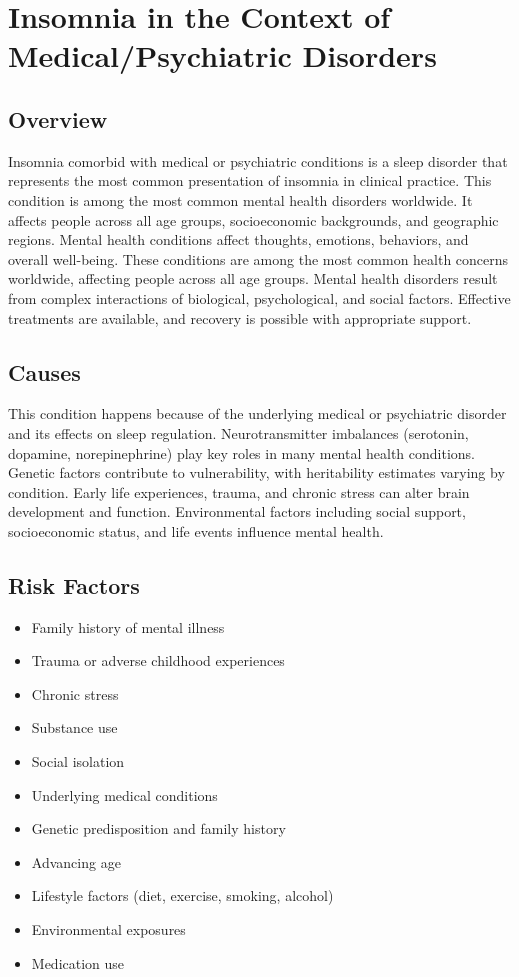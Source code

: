 \chapter{Insomnia in the Context of Medical/Psychiatric Disorders}
\label{sec:Insomnia in the Context of Medical Psychiatric Disorders}

\section{Overview}
Insomnia comorbid with medical or psychiatric conditions is a sleep disorder that represents the most common presentation of insomnia in clinical practice. This condition is among the most common mental health disorders worldwide. It affects people across all age groups, socioeconomic backgrounds, and geographic regions. Mental health conditions affect thoughts, emotions, behaviors, and overall well-being. These conditions are among the most common health concerns worldwide, affecting people across all age groups. Mental health disorders result from complex interactions of biological, psychological, and social factors. Effective treatments are available, and recovery is possible with appropriate support.
\section{Causes}
This condition happens because of the underlying medical or psychiatric disorder and its effects on sleep regulation.  Neurotransmitter imbalances (serotonin, dopamine, norepinephrine) play key roles in many mental health conditions. Genetic factors contribute to vulnerability, with heritability estimates varying by condition. Early life experiences, trauma, and chronic stress can alter brain development and function. Environmental factors including social support, socioeconomic status, and life events influence mental health.   
\section{Risk Factors}

\begin{itemize}[noitemsep]
  \item Family history of mental illness
  \item Trauma or adverse childhood experiences
  \item Chronic stress
  \item Substance use
  \item Social isolation
  \item Underlying medical conditions
  \item Genetic predisposition and family history
  \item Advancing age
  \item Lifestyle factors (diet, exercise, smoking, alcohol)
  \item Environmental exposures
  \item Medication use
\end{itemize}
